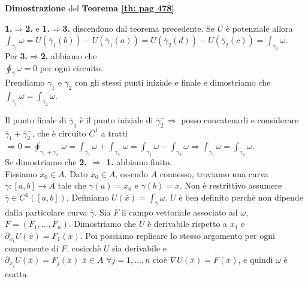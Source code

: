 \begin{dembar}
	\textbf{Dimostrazione} del \textbf{Teorema \ref{th: pag 478}}
	
	\textbf{1.$\Rightarrow $2.} e \textbf{1.$\Rightarrow $3.} discendono dal teorema precedente. Se $U$ è potenziale allora\\
	$\int_{\overline{\gamma}_1}\omega=U(\overline{\gamma}_1(b))-U(\overline{\gamma}_1(a))=U(\overline{\gamma}_2(d))-U(\overline{\gamma}_2(c))=\int_{\overline{\gamma}_2}\omega$.\\
	Per \textbf{3.$\Rightarrow$2.} abbiamo che\\
	$\oint_{\overline{\gamma}}\omega =0$ per ogni circuito.\\
	Prendiamo $\overline{\gamma}_1$ e $\overline{\gamma}_2$ con gli stessi punti iniziale e finale e dimostriamo che $\int_{\overline{\gamma}_1}\omega=\int_{\overline{\gamma}_2}\omega$.\\

	\segnaposto %

	Il punto finale di $\overline{\gamma}_1$ è il punto iniziale di $\overline{\gamma}_2^- \Rightarrow$ posso concatenarli e considerare $\overline{\gamma}_1+\overline{\gamma}_2^-$, che è circuito $C^1$ a tratti\\
	$\Rightarrow 0 =\oint_{\overline{\gamma}_1+\overline{\gamma}_2^-}\omega=\int_{\overline{\gamma}_1}\omega+\int_{\overline{\gamma}_2^-}\omega= \int_{\overline{\gamma}_1}\omega - \int_{\overline{\gamma}_2}\omega\Rightarrow \int_{\overline{\gamma}_1}\omega = \int_{\overline{\gamma}_2}\omega$.\\
	Se dimostriamo che \textbf{2. $\Rightarrow$ 1.} abbiamo finito.\\
	Fissiamo $\overline{x}_0\in A$. Dato $\overline{x}_0 \in A$,  essendo $A$ connesso, troviamo una curva $\overline{\gamma}:[a,b]\rightarrow A$ tale che $\overline{\gamma}(a)=\overline{x}_0$ e $\overline{\gamma}(b)=\overline{x}$. Non è restrittivo assumere $\overline{\gamma}\in C^1([a,b])$. Definiamo $U(\overline{x})=\int_{\overline{\gamma}}\omega$. $U $ è ben definito perchè non dipende dalla particolare curva $\overline{\gamma}$. Sia $\overline{F}$ il campo vettoriale associato ad $\omega$, $\overline{F}=(F_1,...,F_n)$. Dimostriamo che $U$ è derivabile rispetto a $x_1$ e $\partial_{x_1}U(\overline{x})=F_1(\overline{x})$. Poi possiamo replicare lo stesso argomento per ogni componente di $\overline{F}$, cosicchè $U$ sia derivabile e $\partial_{x_j}U(\overline{x})=F_j(\overline{x})\,\, \overline{x}\in A\,\, \forall j=1,...,n$ cioè $\nabla U(\overline{x})=\overline{F}(\overline{x})$, e quindi $\omega$ è esatta.\\


\end{dembar}
